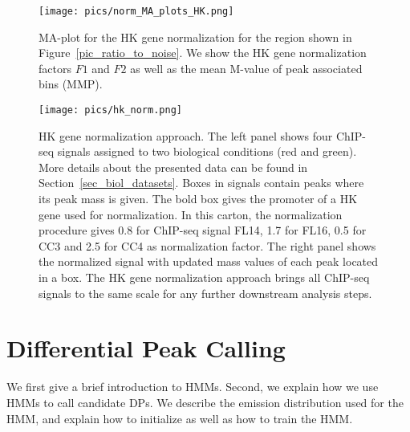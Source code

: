 \begin{figure}[ht]
  \centering
  \texttt{[image: pics/norm\_MA\_plots\_HK.png]}
\caption[MA-plot for HK gene normalization]{MA-plot for the HK gene normalization for the region shown in Figure~\ref{pic_ratio_to_noise}.
We show the HK gene normalization factors $F1$ and $F2$ as well as the mean M-value of peak associated bins (MMP).}
\label{pic_norms_maplot_HK}
\end{figure}

\begin{figure}[ht]
  \centering
  \texttt{[image: pics/hk\_norm.png]}
\caption[Housekeeping gene normalization approach]{HK gene normalization approach. 
The left panel shows four ChIP-seq signals assigned to two biological conditions (red and green).
More details about the presented data can be found in Section~\ref{sec_biol_datasets}. 
Boxes in signals contain peaks where its peak mass is given. 
The bold box gives the promoter of a HK gene used for normalization. 
In this carton, the normalization procedure gives 0.8 for ChIP-seq signal FL14, 1.7 for FL16, 0.5 for CC3 and 2.5 for CC4 as normalization factor. 
The right panel shows the normalized signal with updated mass values of each peak located in a box. 
The HK gene normalization approach brings all ChIP-seq signals to the same scale for any further downstream analysis steps.
}
\label{pic_hk_norm}
\end{figure}




\section{Differential Peak Calling}
\label{sec_dpc}
We first give a brief introduction to HMMs. 
Second, we explain how we use HMMs to call candidate DPs.
We describe the emission distribution used for the HMM, and explain how to initialize as well as how to train the HMM.

